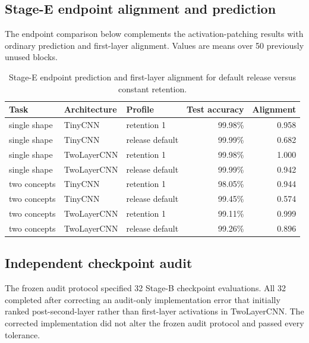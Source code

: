 \subsection{Stage-E endpoint alignment and prediction}\label{app:stage-e-endpoints}

The endpoint comparison below complements the activation-patching results with ordinary prediction and first-layer alignment. Values are means over 50 previously unused blocks.

\begin{table}[h]
\caption{Stage-E endpoint prediction and first-layer alignment for default release versus constant retention.}
\label{tab:stage-e-endpoints}
\centering
\footnotesize
\setlength{\tabcolsep}{3pt}
\begin{tabular}{lllrr}
\toprule
Task & Architecture & Profile & Test accuracy & Alignment \\
\midrule
single shape & TinyCNN & retention 1 & 99.98\% & 0.958 \\
single shape & TinyCNN & release default & 99.99\% & 0.682 \\
\addlinespace[2pt]
single shape & TwoLayerCNN & retention 1 & 99.98\% & 1.000 \\
single shape & TwoLayerCNN & release default & 99.99\% & 0.942 \\
\addlinespace[2pt]
two concepts & TinyCNN & retention 1 & 98.05\% & 0.944 \\
two concepts & TinyCNN & release default & 99.45\% & 0.574 \\
\addlinespace[2pt]
two concepts & TwoLayerCNN & retention 1 & 99.11\% & 0.999 \\
two concepts & TwoLayerCNN & release default & 99.26\% & 0.896 \\
\bottomrule
\end{tabular}
\end{table}

\subsection{Independent checkpoint audit}\label{app:audit}

The frozen audit protocol specified 32 Stage-B checkpoint evaluations. All 32 completed after correcting an audit-only implementation error that initially ranked post-second-layer rather than first-layer activations in TwoLayerCNN. The corrected implementation did not alter the frozen audit protocol and passed every tolerance.

